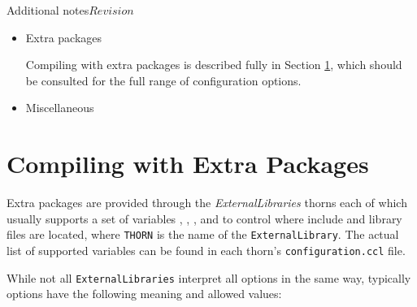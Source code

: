 \begin{cactuspart}{Additional notes}{}{$Revision$}
\begin{itemize}
\item{Extra packages}

Compiling with extra packages is described fully in
Section \ref{subsec:cowiexpa},
which should be consulted for the full range of configuration options.

\item{Miscellaneous}


\end{itemize}




\section{Compiling with Extra Packages}
\label{subsec:cowiexpa}

Extra packages are provided through the \textit{ExternalLibraries} thorns each
of which usually supports a set of variables \texttt{},
\texttt{}, \texttt{}, and
\texttt{} to control where include and library files are
located, where \texttt{THORN} is the name of the \texttt{ExternalLibrary}. The
actual list of supported variables can be found in each thorn's
\texttt{configuration.ccl} file.

While not all \texttt{ExternalLibraries} interpret all options in the same way,
typically options have the following meaning and allowed values:


\end{cactuspart}
